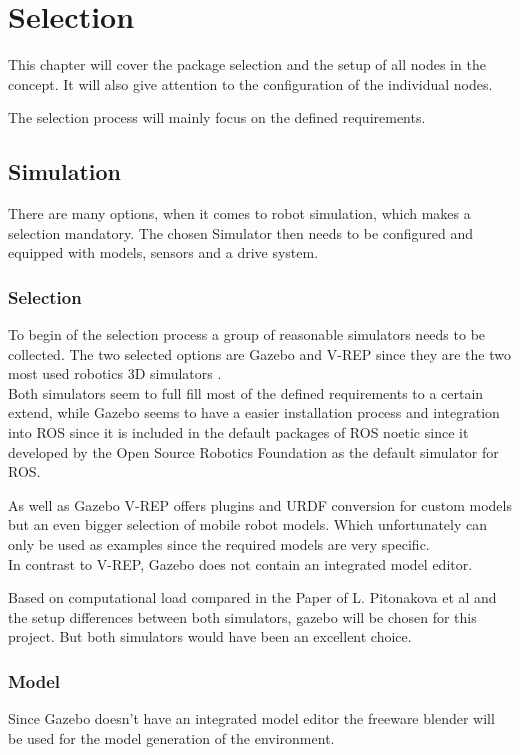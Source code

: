 \chapter{Selection}
\label{Selection}

This chapter will cover the package selection and the setup of all nodes in the concept. It will also give attention to the configuration of the individual nodes.


The selection process will mainly focus on the defined requirements.

\section{Simulation}
There are many options, when it comes to robot simulation, which makes a selection mandatory. The chosen Simulator then needs to be configured and equipped with models, sensors and a drive system.

\subsection{Selection}
To begin of the selection process a group of reasonable simulators needs to be collected. The two selected options are Gazebo and V-REP since they are the two most used robotics 3D simulators \cite{SimComp}.\\

Both simulators seem to full fill most of the defined requirements to a certain extend, while Gazebo seems to have a easier installation process and integration into ROS since it is included in the default packages of ROS noetic \cite{ROSPkg} since it developed by the Open Source Robotics Foundation as the default simulator for ROS.

As well as Gazebo V-REP offers plugins and URDF conversion for custom models but an even bigger selection of mobile robot models. Which unfortunately can only be used as examples since the required models are very specific.\\
In contrast to V-REP, Gazebo does not contain an integrated model editor.

Based on computational load compared in the Paper of L. Pitonakova et al\cite{Pitonakova} and the setup differences between both simulators, gazebo will be chosen for this project. But both simulators would have been an excellent choice.

\subsection{Model}
Since Gazebo doesn't have an integrated model editor the freeware blender will be used for the model generation of the environment.

